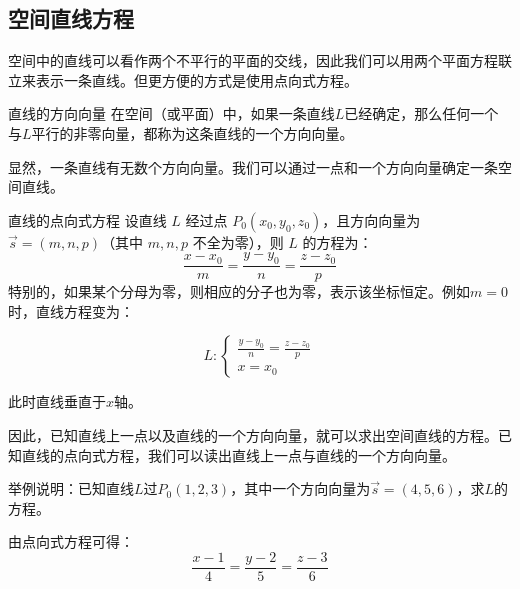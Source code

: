 \begin{myexample}
\begin{center}
\end{center}

\end{myexample}

\subsection{空间直线方程}
空间中的直线可以看作两个不平行的平面的交线，因此我们可以用两个平面方程联立来表示一条直线。但更方便的方式是使用点向式方程。

\begin{definition}{直线的方向向量}{}
在空间（或平面）中，如果一条直线$L$已经确定，那么任何一个与$L$平行的非零向量，都称为这条直线的一个方向向量。
\end{definition}

显然，一条直线有无数个方向向量。我们可以通过一点和一个方向向量确定一条空间直线。


\begin{definition}{直线的点向式方程}{}
设直线 $L$ 经过点 $P_0(x_0,y_0,z_0)$，且方向向量为 $\vec{s}=(m,n,p)$（其中 $m,n,p$ 不全为零），则 $L$ 的方程为：
\[
\frac{x-x_0}{m} = \frac{y-y_0}{n} = \frac{z-z_0}{p}
\]
特别的，如果某个分母为零，则相应的分子也为零，表示该坐标恒定。例如$m=0$时，直线方程变为：

$$L: \begin{cases}\frac{y-y_0}{n} = \frac{z-z_0}{p}\\x=x_0\end{cases}$$

此时直线垂直于$x$轴。

\end{definition}

因此，已知直线上一点以及直线的一个方向向量，就可以求出空间直线的方程。已知直线的点向式方程，我们可以读出直线上一点与直线的一个方向向量。

\begin{myexample}
  举例说明：已知直线$L$过$P_0(1,2,3)$，其中一个方向向量为$\vec{s}=(4,5,6)$，求$L$的方程。

  由点向式方程可得：
  \[
  \frac{x-1}{4} = \frac{y-2}{5} = \frac{z-3}{6}
  \]
\end{myexample}

